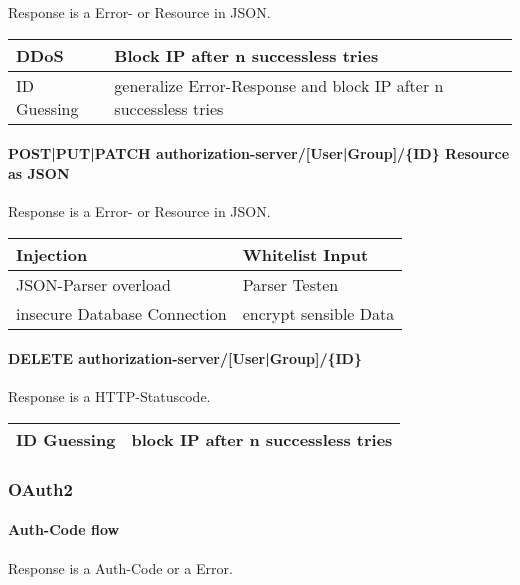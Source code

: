 Response is a Error- or Resource in JSON.

\begin{tabular}{|l|l|}
    \hline
    DDoS & Block IP after n successless tries\\
    \hline
    ID Guessing & generalize Error-Response and block IP after n successless tries\\

    \hline
 \end{tabular}

\paragraph{POST|PUT|PATCH authorization-server/[User|Group]/\{ID\} Resource as JSON} 

Response is a Error- or Resource in JSON. 
\begin{tabular}{|l|l|}
    \hline
    Injection & Whitelist Input\\
    \hline
    JSON-Parser overload & Parser Testen \\
    \hline
    insecure Database Connection & encrypt sensible Data \\
    \hline
 \end{tabular}

\paragraph{DELETE authorization-server/[User|Group]/\{ID\}}

Response is a HTTP-Statuscode.

\begin{tabular}{|l|l|}
   \hline
    ID Guessing & block IP after n successless tries\\
    \hline
 \end{tabular}

\subsubsection{OAuth2}

\paragraph{Auth-Code flow}

Response is a Auth-Code or a Error.

